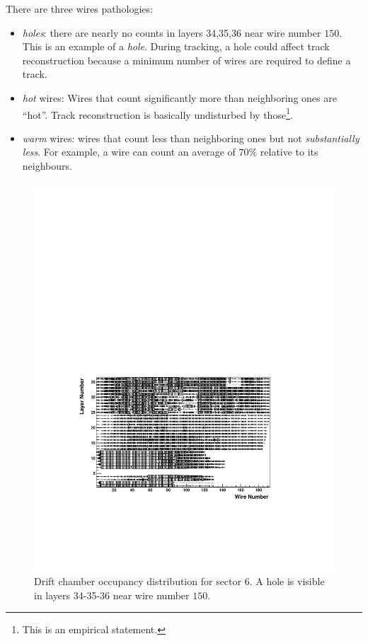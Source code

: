 There are three wires pathologies:
\begin{itemize}
\item {\em holes}: there are nearly no counts in layers 34,35,36 near wire number $ 150$. 
                   This is an example of a {\em hole}. During tracking, a hole could affect track reconstruction 
		   because a minimum number of 
                   wires are required to define a track.

\item{\em hot} wires:  Wires that count significantly more than neighboring ones are ``hot''. Track reconstruction is basically undisturbed by 
                       those\footnote {This is an empirical statement.}.

\item{\em warm} wires: wires that count less than neighboring ones but not {\it substantially less}.
                       For example, a wire can count an average of $70\%$ relative to its neighbours. 
		       		      		       
\end{itemize}




\begin{figure}[h]
 \begin{center}
 \includegraphics[width = 15cm, bb=40 150 580 420]{acceptance/img/sector6_occupancy} 
  \caption[Drift chamber occupancy distribution for sector 6]
          { Drift chamber occupancy distribution for sector 6. A hole is visible in 
	             layers 34-35-36 near wire number $ 150$.}
 \label{fig:dc_occupancy}
 \end{center}
\end{figure} 

